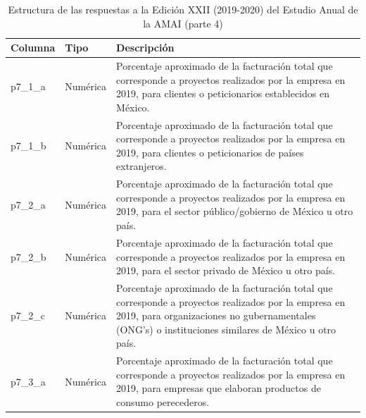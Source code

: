 \begin{table}[]
\caption{Estructura de las respuestas a la Edición XXII (2019-2020) del Estudio Anual de la AMAI (parte 4)}
\label{tab:raw2019_4}
\begin{tabular}{|l|l|l|}
\hline
Columna &
  Tipo &
  Descripción \\ \hline
p7\_1\_a &
  Numérica &
  \parbox[t]{9cm}{Porcentaje aproximado de la facturación total que corresponde a proyectos realizados por la empresa en 2019, para clientes o peticionarios establecidos en México. \vspace{0.1cm}} \\ \hline
p7\_1\_b &
  Numérica &
  \parbox[t]{9cm}{Porcentaje aproximado de la facturación total que corresponde a proyectos realizados por la empresa en 2019, para clientes o peticionarios de países extranjeros. \vspace{0.1cm}} \\ \hline
p7\_2\_a &
  Numérica &
  \parbox[t]{9cm}{Porcentaje aproximado de la facturación total que corresponde a proyectos realizados por la empresa en 2019, para el sector público/gobierno de México u otro país. \vspace{0.1cm}} \\ \hline
p7\_2\_b &
  Numérica &
  \parbox[t]{9cm}{Porcentaje aproximado de la facturación total que corresponde a proyectos realizados por la empresa en 2019, para el sector privado de México u otro país. \vspace{0.1cm}} \\ \hline
p7\_2\_c &
  Numérica &
  \parbox[t]{9cm}{Porcentaje aproximado de la facturación total que corresponde a proyectos realizados por la empresa en 2019, para organizaciones no gubernamentales (ONG's) o instituciones similares de México u otro país. \vspace{0.1cm}} \\ \hline
p7\_3\_a &
  Numérica &
  \parbox[t]{9cm}{Porcentaje aproximado de la facturación total que corresponde a proyectos realizados por la empresa en 2019, para empresas que elaboran productos de consumo perecederos. \vspace{0.1cm}} \\ \hline
\end{tabular}
\end{table}



